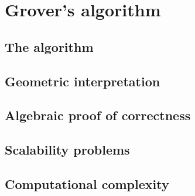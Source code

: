 \chapter{Grover's algorithm}
\section{The algorithm}\label{sec:the-algorithm}
\section{Geometric interpretation}
\section{Algebraic proof of correctness}
\section{Scalability problems}
\section{Computational complexity}